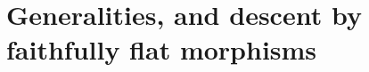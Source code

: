 \chapter{Generalities, and descent by faithfully flat morphisms}\label{fga3.i}



\newpage


\newpage

